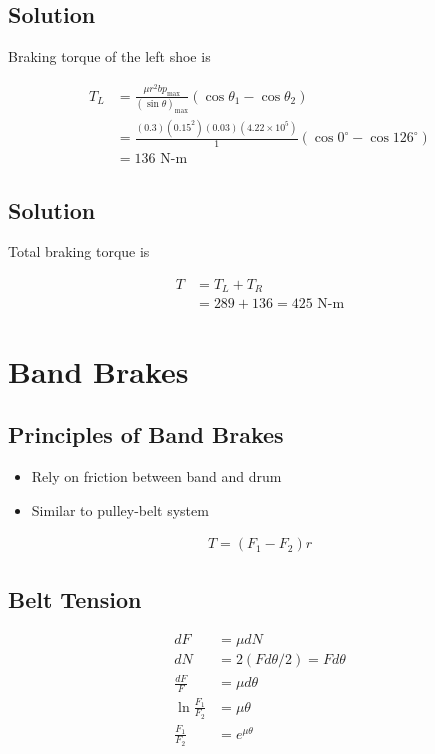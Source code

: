 \documentclass[
10pt,
a4paper,
openany,
svgnames,
]{book}
\begin{document}
\subsection*{Solution}
\label{sec:org24c92b0}

Braking torque of the left shoe is

\begin{align*}
    T_L &= \frac{\mu r^2 bp_{\max}}{(\sin \theta)_{\max}} (\cos \theta_1 - \cos \theta_2) \\
        &= \frac{(0.3)(0.15^2)(0.03)(4.22 \times 10^5)}{1} (\cos 0^{\circ} - \cos 126^{\circ}) \\
        &= 136 \text{ N-m}
\end{align*}

\subsection*{Solution}
\label{sec:orgcba9d1d}

Total braking torque is

\begin{align*}
    T &= T_L + T_R \\
        &= 289 + 136 = 425 \text{ N-m}
\end{align*}

\section*{Band Brakes}
\label{sec:orge7c55cc}

\subsection*{Principles of Band Brakes}
\label{sec:org6a17ac9}

\begin{itemize}
\item Rely on friction between band and drum
\item Similar to pulley-belt system
\end{itemize}

\begin{align*}
    T = (F_1 - F_2)r
\end{align*}

\subsection*{Belt Tension}
\label{sec:orge118626}

\begin{center}
\end{center}
\begin{align*}
    dF &= \mu dN \\
    dN &= 2(F d\theta/2) = Fd\theta \\
    \frac{dF}{F} &= \mu d\theta \\
    \ln \frac{F_1}{F_2} &= \mu \theta \\
    \frac{F_1}{F_2} &= e^{\mu\theta}
\end{align*}
\end{document}
